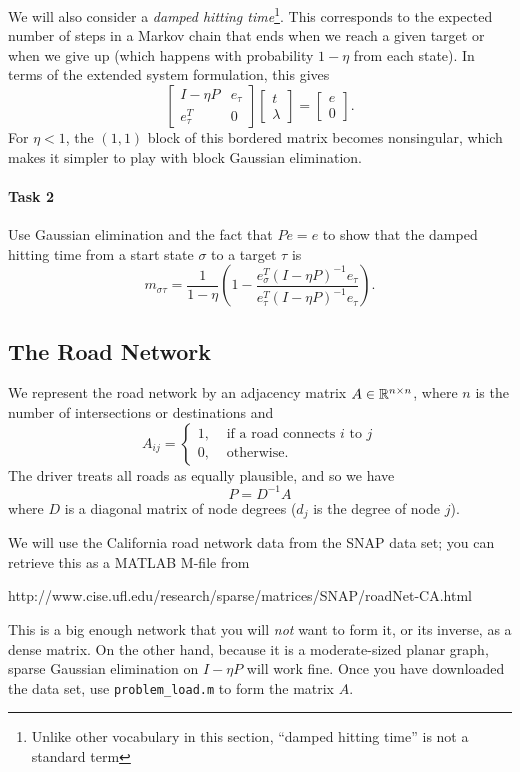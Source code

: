 \documentclass[12pt, leqno]{article}
\begin{document}
We will also consider a {\em damped hitting time}\footnote{Unlike
  other vocabulary in this section, ``damped hitting time'' is not a
  standard term}.  This corresponds to the expected number of steps in
a Markov chain that ends when we reach a given target or when we give
up (which happens with probability $1-\eta$ from each state).  In
terms of the extended system formulation, this gives
\[
\begin{bmatrix} I-\eta P & e_{\tau} \\ e_{\tau}^T & 0 \end{bmatrix}
\begin{bmatrix} t \\ \lambda \end{bmatrix} =
\begin{bmatrix} e \\ 0 \end{bmatrix}.
\]
For $\eta < 1$, the $(1,1)$ block of this bordered matrix becomes
nonsingular, which makes it simpler to play with block Gaussian
elimination.

\paragraph*{Task 2}
Use Gaussian elimination and the fact that $Pe = e$ to
show that the damped hitting time from a start state $\sigma$ to a
target $\tau$ is
\[
m_{\sigma \tau} = \frac{1}{1-\eta}
\left( 1-\frac{e_{\sigma}^T (I-\eta P)^{-1} e_{\tau}}
              {e_{\tau}^T (I-\eta P)^{-1} e_{\tau}} \right).
\]

\subsection*{The Road Network}

We represent the road network by an adjacency matrix
$A \in \mathbb{R}^{n \times n}$, where $n$ is the number of intersections
or destinations and
\[
  A_{ij} =
  \begin{cases}
    1, & \mbox{ if a road connects $i$ to $j$} \\
    0, & \mbox{ otherwise}.
  \end{cases}
\]
The driver treats all roads as equally plausible, and so we have
\[
  P = D^{-1} A
\]
where $D$ is a diagonal matrix of node degrees ($d_j$ is the
degree of node $j$).

We will use the California road network data from the SNAP data
set; you can retrieve this as a MATLAB M-file from
\begin{center}
  http://www.cise.ufl.edu/research/sparse/matrices/SNAP/roadNet-CA.html
\end{center}
This is a big enough network that you will {\em not} want to form it,
or its inverse, as a dense matrix.  On the other hand, because it is a
moderate-sized planar graph, sparse Gaussian elimination
on $I-\eta P$ will work fine.  Once you have downloaded the data
set, use {\tt problem\_load.m} to form the matrix $A$.
\end{document}
